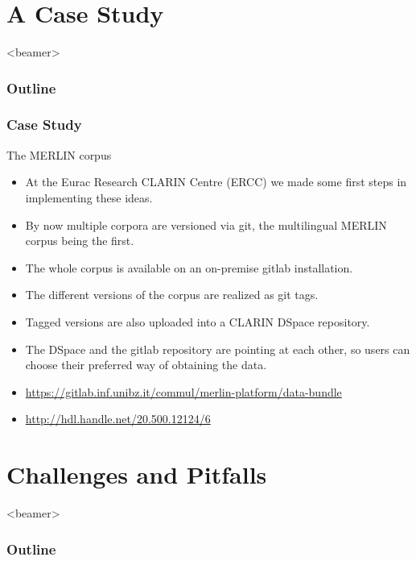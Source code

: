 \documentclass[]{beamer}
\begin{document}
\section[p.three]{A Case Study}
{%
\begin{frame}<beamer>
    \frametitle{Outline}
\tableofcontents[currentsection]
\end{frame}
}

    \begin{frame}
        \frametitle{Case Study}
        \begin{block}{The MERLIN corpus}
            \begin{itemize}
				\item At the Eurac Research CLARIN Centre (ERCC) we made some first steps in implementing these ideas.
				\pause
				\item By now multiple corpora are versioned via git, the multilingual MERLIN corpus being the first.
				\pause
				\item The whole corpus is available on an on-premise gitlab installation.
				\pause
				\item The different versions of the corpus are realized as git tags.
				\pause
				\item Tagged versions are also uploaded into a CLARIN DSpace repository.
				\pause
				\item The DSpace and the gitlab repository are pointing at each other, so users can choose their preferred way of obtaining the data.
				\pause
				\item {\small \url{https://gitlab.inf.unibz.it/commul/merlin-platform/data-bundle}}
				\pause
				\item \url{http://hdl.handle.net/20.500.12124/6}
     		\end{itemize}
        \end{block}
    \end{frame}

\section[p.four]{Challenges and Pitfalls}
{%
\begin{frame}<beamer>
    \frametitle{Outline}
\tableofcontents[currentsection]
\end{frame}
}
\end{document}
